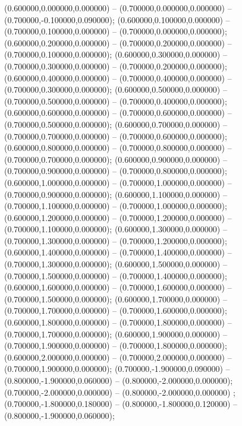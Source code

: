  (0.600000,0.000000,0.000000) -- (0.700000,0.000000,0.000000) -- (0.700000,-0.100000,0.090000);
 (0.600000,0.100000,0.000000) -- (0.700000,0.100000,0.000000) -- (0.700000,0.000000,0.000000);
 (0.600000,0.200000,0.000000) -- (0.700000,0.200000,0.000000) -- (0.700000,0.100000,0.000000);
 (0.600000,0.300000,0.000000) -- (0.700000,0.300000,0.000000) -- (0.700000,0.200000,0.000000);
 (0.600000,0.400000,0.000000) -- (0.700000,0.400000,0.000000) -- (0.700000,0.300000,0.000000);
 (0.600000,0.500000,0.000000) -- (0.700000,0.500000,0.000000) -- (0.700000,0.400000,0.000000);
 (0.600000,0.600000,0.000000) -- (0.700000,0.600000,0.000000) -- (0.700000,0.500000,0.000000);
 (0.600000,0.700000,0.000000) -- (0.700000,0.700000,0.000000) -- (0.700000,0.600000,0.000000);
 (0.600000,0.800000,0.000000) -- (0.700000,0.800000,0.000000) -- (0.700000,0.700000,0.000000);
 (0.600000,0.900000,0.000000) -- (0.700000,0.900000,0.000000) -- (0.700000,0.800000,0.000000);
 (0.600000,1.000000,0.000000) -- (0.700000,1.000000,0.000000) -- (0.700000,0.900000,0.000000);
 (0.600000,1.100000,0.000000) -- (0.700000,1.100000,0.000000) -- (0.700000,1.000000,0.000000);
 (0.600000,1.200000,0.000000) -- (0.700000,1.200000,0.000000) -- (0.700000,1.100000,0.000000);
 (0.600000,1.300000,0.000000) -- (0.700000,1.300000,0.000000) -- (0.700000,1.200000,0.000000);
 (0.600000,1.400000,0.000000) -- (0.700000,1.400000,0.000000) -- (0.700000,1.300000,0.000000);
 (0.600000,1.500000,0.000000) -- (0.700000,1.500000,0.000000) -- (0.700000,1.400000,0.000000);
 (0.600000,1.600000,0.000000) -- (0.700000,1.600000,0.000000) -- (0.700000,1.500000,0.000000);
 (0.600000,1.700000,0.000000) -- (0.700000,1.700000,0.000000) -- (0.700000,1.600000,0.000000);
 (0.600000,1.800000,0.000000) -- (0.700000,1.800000,0.000000) -- (0.700000,1.700000,0.000000);
 (0.600000,1.900000,0.000000) -- (0.700000,1.900000,0.000000) -- (0.700000,1.800000,0.000000);
 (0.600000,2.000000,0.000000) -- (0.700000,2.000000,0.000000) -- (0.700000,1.900000,0.000000);
 (0.700000,-1.900000,0.090000) -- (0.800000,-1.900000,0.060000) -- (0.800000,-2.000000,0.000000);
 (0.700000,-2.000000,0.000000) -- (0.800000,-2.000000,0.000000) ;
 (0.700000,-1.800000,0.180000) -- (0.800000,-1.800000,0.120000) -- (0.800000,-1.900000,0.060000);
